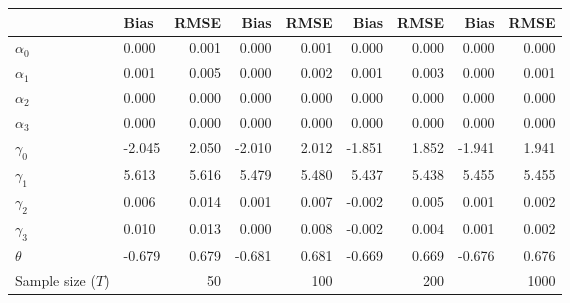 
\begin{tabular}[t]{llrrrrrrr}
\toprule
  & Bias & RMSE & Bias & RMSE & Bias & RMSE & Bias & RMSE\\
\midrule
$\alpha_{0}$ & 0.000 & 0.001 & 0.000 & 0.001 & 0.000 & 0.000 & 0.000 & 0.000\\
$\alpha_{1}$ & 0.001 & 0.005 & 0.000 & 0.002 & 0.001 & 0.003 & 0.000 & 0.001\\
$\alpha_{2}$ & 0.000 & 0.000 & 0.000 & 0.000 & 0.000 & 0.000 & 0.000 & 0.000\\
$\alpha_{3}$ & 0.000 & 0.000 & 0.000 & 0.000 & 0.000 & 0.000 & 0.000 & 0.000\\
$\gamma_{0}$ & -2.045 & 2.050 & -2.010 & 2.012 & -1.851 & 1.852 & -1.941 & 1.941\\
$\gamma_{1}$ & 5.613 & 5.616 & 5.479 & 5.480 & 5.437 & 5.438 & 5.455 & 5.455\\
$\gamma_{2}$ & 0.006 & 0.014 & 0.001 & 0.007 & -0.002 & 0.005 & 0.001 & 0.002\\
$\gamma_{3}$ & 0.010 & 0.013 & 0.000 & 0.008 & -0.002 & 0.004 & 0.001 & 0.002\\
$\theta$ & -0.679 & 0.679 & -0.681 & 0.681 & -0.669 & 0.669 & -0.676 & 0.676\\
Sample size ($T$) &  & 50 &  & 100 &  & 200 &  & 1000\\
\bottomrule
\end{tabular}
